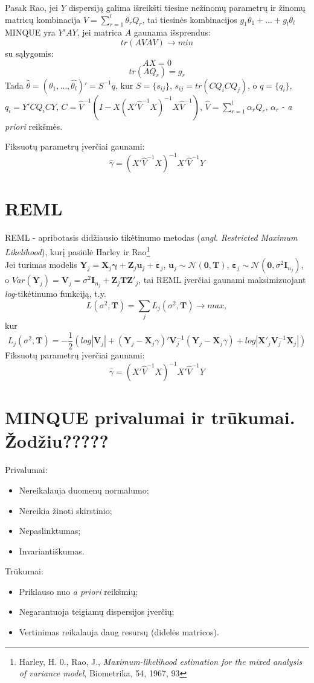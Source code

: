 \documentclass[12pt,a4paper]{article}
\begin{document}
\indent Pasak Rao, jei $Y$ dispersiją galima išreikšti tiesine nežinomų parametrų ir žinomų matricų kombinacija $V= \sum^l_{r=1}\theta_r Q_r$, tai tiesinės kombinacijos $g_1 \theta_1+\dots+g_l \theta_l$ MINQUE yra $Y'AY$, jei matrica $A$ gaunama išsprendus:
\[tr(AVAV) \to min\]
su sąlygomis:
\[AX = 0\]
\[tr(AQ_r)=g_r\]
Tada $\hat{\theta} = (\hat{\theta_1},\dots,\hat{\theta_l})'=S^{-1}q$, kur $S=\{s_{ij}\}$, $s_{ij}=tr(CQ_iCQ_j)$, o
$q=\{q_i\}$, $q_i=Y'CQ_iCY$, $C = \hat{V}^{-1}(I-X(X' \hat{V}^{-1}X)^{-1}X \hat{V}^{-1})$, $\hat{V}=\sum^l_{r=1}\alpha_rQ_r$, $\alpha_r$ - \textit{a priori} reikšmės.

Fiksuotų parametrų įverčiai gaunami:
\[\hat{\gamma}=(X'\hat{V}^{-1}X)^{-1}X'\hat{V}^{-1}Y\]

\section{REML}
REML - apribotasis didžiausio tikėtinumo metodas (\textit{angl. Restricted Maximum Likelihood}), kurį pasiūlė Harley ir Rao\footnote{Harley, H. 0., Rao, J., \textit{Maximum-likelihood estimation for the mixed analysis of variance model}, Biometrika, 54, 1967, 93}\\
Jei turimas modelis $\mathbf{Y}_j=\mathbf{X}_j\boldsymbol{\gamma}+\mathbf{Z}_j\mathbf{u}_j+\boldsymbol{\varepsilon}_j$, $\mathbf{u}_j\sim \mathcal{N}(\mathbf{0}, \mathbf{T})$, $\boldsymbol{\varepsilon}_j\sim \mathcal{N}(\mathbf{0}, \sigma^2 \mathbf{I}_{n_j})$, o $Var(\mathbf{Y}_j)=\mathbf{V}_j=\sigma^2 \mathbf{I}_{n_j} + \mathbf{Z}_j\mathbf{T}\mathbf{Z}'_j$, tai REML įverčiai gaunami maksimizuojant \textit{log}-tikėtinumo funkciją, t.y.
\[
L(\sigma^2, \mathbf{T})=\sum_j L_j(\sigma^2, \mathbf{T}) \to max,
\]
kur
\[
L_j(\sigma^2, \mathbf{T})=-\frac{1}{2}\left( log|\mathbf{V}_j|+(\mathbf{Y}_j-\mathbf{X}_j\gamma)'\mathbf{V}_j^{-1}(\mathbf{Y}_j-\mathbf{X}_j\gamma)+log|\mathbf{X}'_j\mathbf{V}_j^{-1}\mathbf{X}_j|\right)
\]
Fiksuotų parametrų įverčiai gaunami:
\[\hat{\gamma}=(X'\hat{V}^{-1}X)^{-1}X'\hat{V}^{-1}Y\]

\section{MINQUE privalumai ir trūkumai. Žodžiu?????}
Privalumai:
\begin{itemize}
\item Nereikalauja duomenų normalumo;
\item Nereikia žinoti skirstinio;
\item Nepaslinktumas;
\item Invariantiškumas.
\end{itemize}
Trūkumai:
\begin{itemize}
\item Priklauso nuo \textit{a priori} reikšmių;
\item Negarantuoja teigiamų dispersijos įverčių;
\item Vertinimas reikalauja daug resursų (didelės matricos).
\end{itemize}
\end{document}
